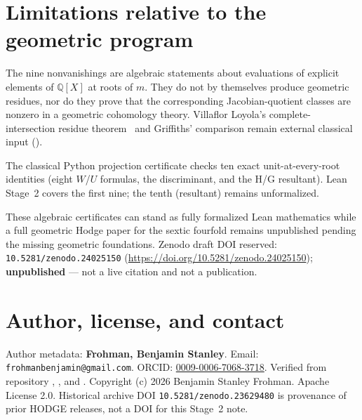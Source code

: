 \documentclass[11pt,a4paper]{article}
\newcommand{\Q}{\mathbb{Q}}
\newcommand{\lean}[1]{\texttt{\detokenize{#1}}}
\theoremstyle{definition}
\begin{document}
\section{Limitations relative to the geometric program}

The nine nonvanishings are algebraic statements about evaluations of
explicit elements of $\Q[X]$ at roots of $m$. They do not by themselves
produce geometric residues, nor do they prove that the corresponding
Jacobian-quotient classes are nonzero in a geometric cohomology theory.
Villaflor Loyola's complete-intersection residue theorem~\cite{Villaflor2021}
and Griffiths' comparison remain external classical input
(\lean{NOTICE.md}).

The classical Python projection certificate checks ten exact unit-at-every-root
identities (eight $W$/$U$ formulas, the discriminant, and the H/G resultant).
Lean Stage~2 covers the first nine; the tenth (resultant) remains unformalized.

These algebraic certificates can stand as fully formalized Lean mathematics
while a full geometric Hodge paper for the sextic fourfold remains unpublished
pending the missing geometric foundations. Zenodo draft DOI reserved: \texttt{10.5281/zenodo.24025150} (\url{https://doi.org/10.5281/zenodo.24025150}); \textbf{unpublished} --- not a live citation and not a publication.

\section*{Author, license, and contact}
Author metadata: \textbf{Frohman, Benjamin Stanley}.
Email: \texttt{frohmanbenjamin@gmail.com}.
ORCID: \href{https://orcid.org/0009-0006-7068-3718}{0009-0006-7068-3718}.
Verified from repository , , and
.
Copyright (c) 2026 Benjamin Stanley Frohman. Apache License 2.0.
Historical archive DOI \texttt{10.5281/zenodo.23629480} is provenance of
prior HODGE releases, not a DOI for this Stage~2 note.



\end{document}
